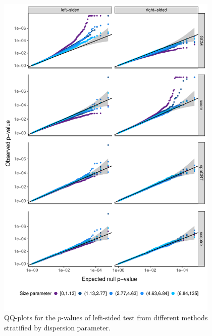\documentclass[12pt]{article}
\theoremstyle{definition}
\begin{document}
\begin{figure}[!ht]
	\centering
	\includegraphics[width=0.95\textwidth]{figures-and-tables/real-data/facet_plot_different_withglmnb_dispersion.pdf}
	\caption{QQ-plots for the $p$-values of left-sided test from different methods stratified by dispersion parameter.}
	\label{fig:qqplot_dispersion}
\end{figure}
\end{document}
